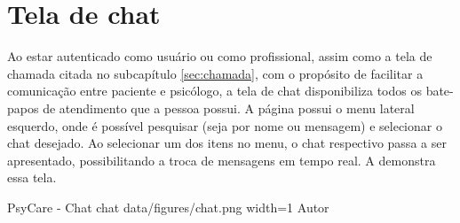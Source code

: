 \section{Tela de chat}
\label{sec:chat}

Ao estar autenticado como usuário ou como profissional, assim como a tela de chamada citada no subcapítulo \ref{sec:chamada}, com o propósito de facilitar a comunicação entre paciente e psicólogo, a tela de chat disponibiliza todos os bate-papos de atendimento que a pessoa possui. A página possui o menu lateral esquerdo, onde é possível pesquisar (seja por nome ou mensagem) e selecionar o chat desejado. Ao selecionar um dos itens no menu, o chat respectivo passa a ser apresentado, possibilitando a troca de mensagens em tempo real. A  demonstra essa tela.

\image
    {PsyCare - Chat}
    {chat}
    {data/figures/chat.png}
    {width=1\textwidth}
    {Autor}
